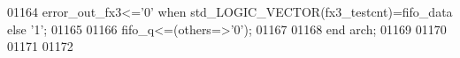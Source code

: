 \begin{DoxyCode}
01164 \textcolor{vhdlchar}{error_out_fx3}\textcolor{vhdlchar}{<=}\textcolor{vhdlchar}{'}\textcolor{vhdllogic}{}\textcolor{vhdllogic}{0}\textcolor{vhdlchar}{'} \textcolor{keywordflow}{when}  \textcolor{comment}{std\_LOGIC\_VECTOR}\textcolor{vhdlchar}{(}\textcolor{vhdlchar}{fx3_testcnt}\textcolor{vhdlchar}{)}\textcolor{vhdlchar}{=}\textcolor{vhdlchar}{fifo_data} \textcolor{keywordflow}{else} \textcolor{vhdlchar}{'}\textcolor{vhdllogic}{}\textcolor{vhdllogic}{1}\textcolor{vhdlchar}{'}; 
01165 
01166 \textcolor{vhdlchar}{fifo_q}\textcolor{vhdlchar}{<=}\textcolor{vhdlchar}{(}\textcolor{keywordflow}{others}\textcolor{vhdlchar}{=}\textcolor{vhdlchar}{>}\textcolor{vhdlchar}{'}\textcolor{vhdllogic}{}\textcolor{vhdllogic}{0}\textcolor{vhdlchar}{'}\textcolor{vhdlchar}{)}; 
01167         
01168 \textcolor{keywordflow}{end} \textcolor{vhdlchar}{arch};   
01169 
01170 
01171 
01172 
\end{DoxyCode}
